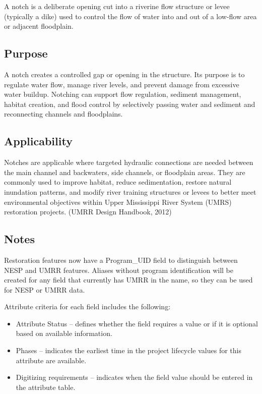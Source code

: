 \documentclass[
  letterpaper,
  DIV=11,
  numbers=noendperiod]{scrreprt}
\providecommand{\tightlist}{%
  \setlength{\itemsep}{0pt}\setlength{\parskip}{0pt}}
\begin{document}
A notch is a deliberate opening cut into a riverine flow structure or
levee (typically a dike) used to control the flow of water into and out
of a low-flow area or adjacent floodplain.

\subsection{Purpose}\label{purpose-11}

A notch creates a controlled gap or opening in the structure. Its
purpose is to regulate water flow, manage river levels, and prevent
damage from excessive water buildup. Notching can support flow
regulation, sediment management, habitat creation, and flood control by
selectively passing water and sediment and reconnecting channels and
floodplains.

\subsection{Applicability}\label{applicability-9}

Notches are applicable where targeted hydraulic connections are needed
between the main channel and backwaters, side channels, or floodplain
areas. They are commonly used to improve habitat, reduce sedimentation,
restore natural inundation patterns, and modify river training
structures or levees to better meet environmental objectives within
Upper Mississippi River System (UMRS) restoration projects. (UMRR Design
Handbook, 2012)

\subsection{Notes}\label{notes-11}

Restoration features now have a Program\_UID field to distinguish
between NESP and UMRR features. Aliases without program identification
will be created for any field that currently has UMRR in the name, so
they can be used for NESP or UMRR data.

Attribute criteria for each field includes the following:

\begin{itemize}
\tightlist
\item
  Attribute Status -- defines whether the field requires a value or if
  it is optional based on available information.
\item
  Phases -- indicates the earliest time in the project lifecycle values
  for this attribute are available.
\item
  Digitizing requirements -- indicates when the field value should be
  entered in the attribute table.
\end{itemize}
\end{document}

